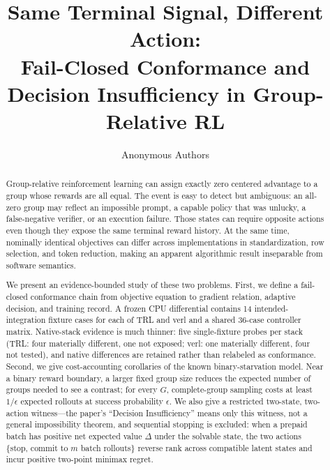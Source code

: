 \documentclass{article}
\title{Same Terminal Signal, Different Action:\\
Fail-Closed Conformance and Decision Insufficiency in Group-Relative RL}
\author{Anonymous Authors}
\begin{document}
\maketitle

\begin{abstract}
Group-relative reinforcement learning can assign exactly zero centered
advantage to a group whose rewards are all equal.  The event is easy to detect
but ambiguous: an all-zero group may reflect an impossible prompt, a capable
policy that was unlucky, a false-negative verifier, or an execution failure.
Those states can require opposite actions even though they expose the same
terminal reward history.  At the same time, nominally identical objectives can
differ across implementations in standardization, row selection, and token
reduction, making an apparent algorithmic result inseparable from software
semantics.

We present an evidence-bounded study of these two problems.  First, we define a
fail-closed conformance chain from objective equation to gradient relation,
adaptive decision, and training record.  A frozen CPU differential contains 14
intended-integration fixture cases for each of TRL and verl and a shared
36-case controller matrix.  Native-stack evidence is much thinner: five
single-fixture probes per stack (TRL: four materially different, one not
exposed; verl: one materially different, four not tested), and native
differences are retained rather than relabeled as conformance.
Second, we give cost-accounting corollaries of the known binary-starvation
model.  Near a binary reward boundary, a larger fixed group size reduces the
expected number of groups needed to see a contrast; for every $G$,
complete-group sampling costs at least $1/\epsilon$ expected rollouts at
success probability $\epsilon$.  We also give a restricted two-state, two-action witness---the paper's
``Decision Insufficiency'' means only this witness, not a general
impossibility theorem, and sequential stopping is excluded: when a prepaid
batch has positive net expected value $\Delta$ under the solvable state, the
two actions \{stop, commit to $m$ batch rollouts\} reverse rank across
compatible latent states and incur positive two-point minimax regret.


\end{abstract}
\end{document}
